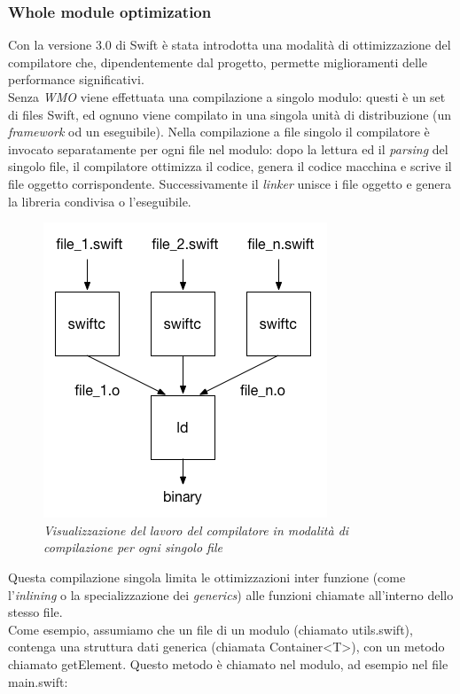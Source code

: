 \subsubsection{Whole module optimization}
Con la versione 3.0 di Swift è stata introdotta una modalità di ottimizzazione del compilatore che, dipendentemente dal progetto, permette miglioramenti delle performance significativi.\\
Senza \textit{WMO} viene effettuata una compilazione a singolo modulo:
questi è un set di files Swift, ed ognuno viene compilato in una singola unità di distribuzione (un \textit{framework} od un eseguibile). Nella compilazione a file singolo il compilatore è invocato separatamente per ogni file nel modulo: dopo la lettura ed il \textit{parsing} del singolo file, il compilatore ottimizza il codice, genera il codice macchina e scrive il file oggetto corrispondente. Successivamente il \textit{linker} unisce i file oggetto e genera la libreria condivisa o l'eseguibile.
\begin{figure}[H]
      \centering
      \includegraphics[scale=0.80]{immagini/single-file.png}
            \vspace{0.8cm}
            \caption{\textit{Visualizzazione del lavoro del compilatore in modalità di compilazione per ogni singolo file}}
\end{figure}
Questa compilazione singola limita le ottimizzazioni inter funzione (come l'\textit{inlining} o la specializzazione dei \textit{generics}) alle funzioni chiamate all'interno dello stesso file.\\Come esempio, assumiamo che un file di un modulo  (chiamato utils.swift), contenga una struttura dati generica (chiamata Container<T>), con un metodo chiamato getElement. Questo metodo è chiamato nel modulo, ad esempio nel file main.swift:
